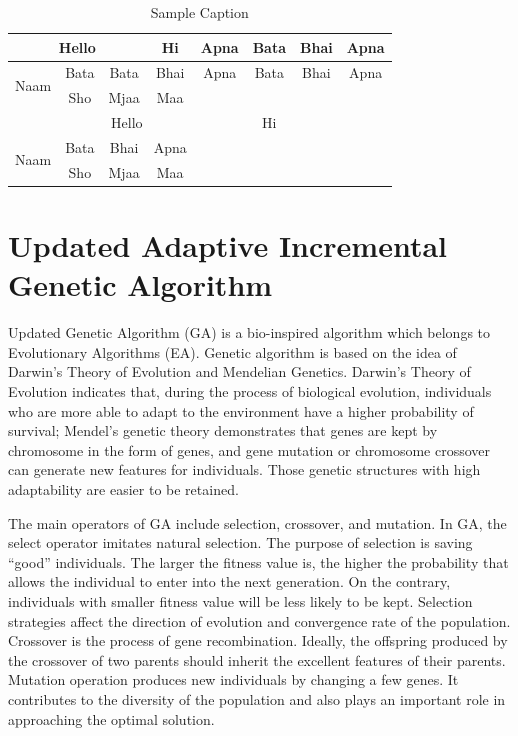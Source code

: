 \documentclass[conference]{IEEEtran}%
\begin{document}
\begin{table}[htbp]
\caption{Sample Caption}
\begin{center}
\begin{tabular}{|c|c|c|c|c|c|c|c|}
\hline
  \multicolumn{3}{|c|}{Hello} & Hi & Apna & Bata & Bhai & Apna  \\
\hline
  \multirow{2}{*}{Naam} & Bata & Bata & Bhai & Apna & Bata & Bhai & Apna  \\
\hhline{~-------}
   & Sho & Mjaa & Maa &  &  &  &   \\
\hline
  \multicolumn{5}{|c|}{Hello} & Hi &  &   \\
\hline
  \multirow{2}{*}{Naam} & Bata & Bhai & Apna &  &  &  &   \\
\hhline{~-------}
   & Sho & Mjaa & Maa &  &  &  &   \\
\hline

\end{tabular}
\label{table}
\end{center}
\end{table}

%
\section{Updated Adaptive Incremental Genetic Algorithm}%
\label{sec:UpdatedAdaptiveIncrementalGeneticAlgorithm}%
Updated Genetic Algorithm (GA) is a bio-inspired algorithm which belongs to Evolutionary Algorithms (EA). Genetic algorithm is based on the idea of Darwin’s Theory of Evolution and Mendelian Genetics. Darwin’s Theory of Evolution indicates that, during the process of biological evolution, individuals who are more able to adapt to the environment have a higher probability of survival; Mendel’s genetic theory demonstrates that genes are kept by chromosome in the form of genes, and gene mutation or chromosome crossover can generate new features for individuals. Those genetic structures with high adaptability are easier to be retained.

 The main operators of GA include selection, crossover, and mutation. In GA, the select operator imitates natural selection. The purpose of selection is saving “good” individuals. The larger the fitness value is, the higher the probability that allows the individual to enter into the next generation. On the contrary, individuals with smaller fitness value will be less likely to be kept. Selection strategies affect the direction of evolution and convergence rate of the population. Crossover is the process of gene recombination. Ideally, the offspring produced by the crossover of two parents should inherit the excellent features of their parents. Mutation operation produces new individuals by changing a few genes. It contributes to the diversity of the population and also plays an important role in approaching the optimal solution.
\end{document}
